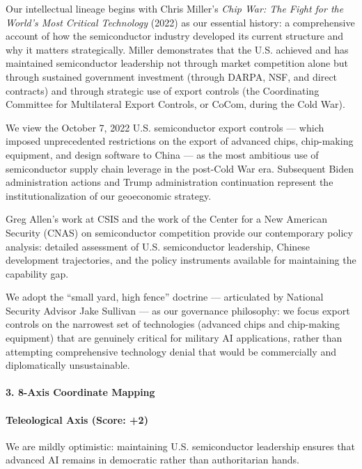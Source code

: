 Our intellectual lineage begins with Chris Miller's \emph{Chip War: The
Fight for the World's Most Critical Technology} (2022) as our essential
history: a comprehensive account of how the semiconductor industry
developed its current structure and why it matters strategically. Miller
demonstrates that the U.S. achieved and has maintained semiconductor
leadership not through market competition alone but through sustained
government investment (through DARPA, NSF, and direct contracts) and
through strategic use of export controls (the Coordinating Committee for
Multilateral Export Controls, or CoCom, during the Cold War).

We view the October 7, 2022 U.S. semiconductor export controls --- which
imposed unprecedented restrictions on the export of advanced chips,
chip-making equipment, and design software to China --- as the most
ambitious use of semiconductor supply chain leverage in the post-Cold
War era. Subsequent Biden administration actions and Trump
administration continuation represent the institutionalization of our
geoeconomic strategy.

Greg Allen's work at CSIS and the work of the Center for a New American
Security (CNAS) on semiconductor competition provide our contemporary
policy analysis: detailed assessment of U.S. semiconductor leadership,
Chinese development trajectories, and the policy instruments available
for maintaining the capability gap.

We adopt the ``small yard, high fence'' doctrine --- articulated by
National Security Advisor Jake Sullivan --- as our governance
philosophy: we focus export controls on the narrowest set of
technologies (advanced chips and chip-making equipment) that are
genuinely critical for military AI applications, rather than attempting
comprehensive technology denial that would be commercially and
diplomatically unsustainable.

\paragraph{3. 8-Axis Coordinate
Mapping}\label{axis-coordinate-mapping-24}

\paragraph{Teleological Axis (Score:
+2)}\label{teleological-axis-score-2-3}

We are mildly optimistic: maintaining U.S. semiconductor leadership
ensures that advanced AI remains in democratic rather than authoritarian
hands.


